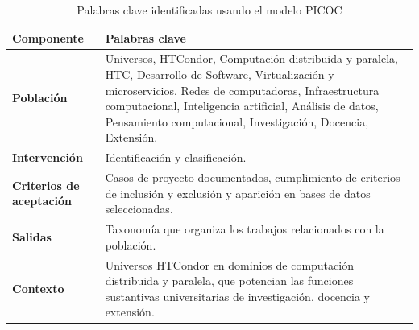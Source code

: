 \begin{table}[htbp]
	\centering
	\caption{Palabras clave identificadas usando el modelo PICOC}
	\label{table:picoc_keywords}
	\renewcommand{\arraystretch}{1}  %
	\begin{tabular}{p{1.8cm}p{6cm}}
		\toprule
		\textbf{Componente}              & \textbf{Palabras clave}                                                                                                                                                                                                                                                                 \\
		\midrule
		\textbf{Población}               & Universos, HTCondor, Computación distribuida y paralela, HTC, Desarrollo de Software, Virtualización y microservicios, Redes de computadoras, Infraestructura computacional, Inteligencia artificial, Análisis de datos, Pensamiento computacional, Investigación, Docencia, Extensión. \\
		\addlinespace[0.8em]
		\textbf{Intervención}            & Identificación y clasificación.                                                                                                                                                                                                                                                         \\
		\addlinespace[0.8em]
		\textbf{Criterios de aceptación} &
		Casos de proyecto documentados, cumplimiento de criterios de inclusión y exclusión y aparición en bases de datos seleccionadas.                                                                                                                                                                                            \\
		\addlinespace[0.8em]
		\textbf{Salidas}                 & Taxonomía que organiza los trabajos relacionados con la población.                                                                                                                                                                                                                      \\
		\addlinespace[0.8em]
		\textbf{Contexto}                & Universos HTCondor en dominios de computación distribuida y paralela, que potencian las funciones sustantivas universitarias de investigación, docencia y extensión.                                                                                                                    \\
		\bottomrule
	\end{tabular}
\end{table}



